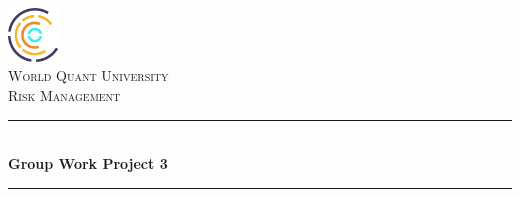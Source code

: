 

\begin{titlepage}

\newcommand{\HRule}{\rule{\linewidth}{0.5mm}} %

\center %
 

\includegraphics[width=50px, keepaspectratio]{wqu.png}\\[1cm] %

\textsc{\LARGE World Quant University}\\[1.5cm] %
\textsc{\Large Risk Management}\\[0.5cm] %


\HRule \\[0.4cm]
{ \huge \bfseries Group Work Project 3}\\[0.4cm] %
\HRule \\[1.5cm]
 


\end{titlepage}
